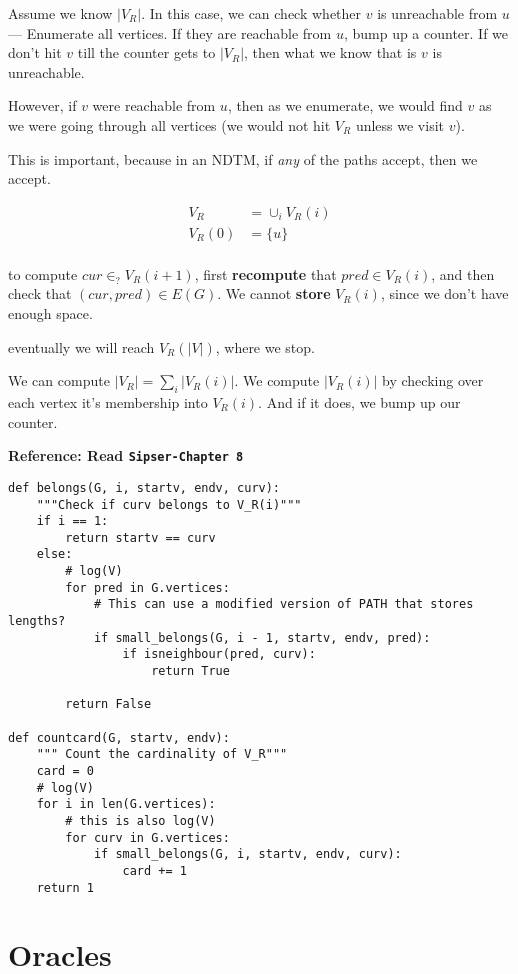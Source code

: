 Assume we know $|V_R|$. In this case, we can check whether $v$ is unreachable
from $u$ --- Enumerate all vertices. If they are reachable from $u$, bump up
a counter.  If we don't hit $v$ till the counter gets to $|V_R|$, then what
we know that is $v$ is unreachable.

However, if $v$ were reachable from $u$, then as we enumerate, we would find
$v$ as we were going through all vertices (we would not hit $V_R$ unless we
visit $v$).

This is important, because in an NDTM, if \textit{any} of the paths
accept, then we accept.

\begin{align*}
V_R &= \cup_i V_R(i) \\
V_R(0) &= \{ u \} \\
\end{align*}

to compute $cur \in_? V_R(i + 1)$, first \textbf{recompute} that $pred \in V_R(i)$,
and then check that $(cur, pred) \in E(G)$. We cannot \textbf{store} $V_R(i)$, since
we don't have enough space.

eventually we will reach $V_R(|V|)$, where we stop.

We can compute $|V_R| = \sum_i |V_R(i)|$.
We compute $|V_R(i)|$ by checking over each vertex it's membership into $V_R(i)$.
And if it does, we bump up our counter. 

\textbf{Reference: Read \texttt{Sipser-Chapter 8}}

\begin{verbatim}
def belongs(G, i, startv, endv, curv):
    """Check if curv belongs to V_R(i)"""
    if i == 1:
        return startv == curv
    else:
        # log(V)
        for pred in G.vertices:
            # This can use a modified version of PATH that stores lengths?
            if small_belongs(G, i - 1, startv, endv, pred):
                if isneighbour(pred, curv):
                    return True

        return False

def countcard(G, startv, endv):
    """ Count the cardinality of V_R"""
    card = 0
    # log(V)
    for i in len(G.vertices):
        # this is also log(V)
        for curv in G.vertices:
            if small_belongs(G, i, startv, endv, curv):
                card += 1
    return 1
\end{verbatim}

\section{Oracles}

